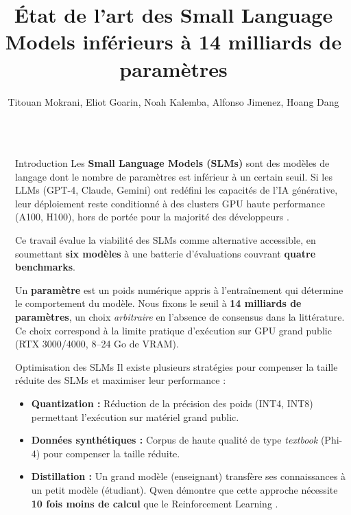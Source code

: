 \documentclass[final]{beamer}
\title{État de l'art des Small Language Models inférieurs à 14 milliards de paramètres}
\author{Titouan Mokrani, Eliot Goarin, Noah Kalemba, Alfonso Jimenez, Hoang Dang}
\institute[shortinst]{Université de Toulouse \\ \small Avec l'aide de Thomas Trouve de chez Neusta France}
\newlength{\sepwidth}
\newlength{\colwidth}
\newcommand{\separatorcolumn}{\begin{column}{\sepwidth}\end{column}}
\begin{document}
\begin{frame}[t]
\begin{columns}[t]
\separatorcolumn

\begin{column}{\colwidth}

  \begin{block}{Introduction}
    Les \textbf{Small Language Models (SLMs)} sont des modèles de langage dont le nombre de paramètres est inférieur à un certain seuil. Si les LLMs (GPT-4, Claude, Gemini) ont redéfini les capacités de l'IA générative, leur déploiement reste conditionné à des clusters GPU haute performance (A100, H100), hors de portée pour la majorité des développeurs \cite{corradini_state_2025}.

    Ce travail évalue la viabilité des SLMs comme alternative accessible, en soumettant \textbf{six modèles} à une batterie d'évaluations couvrant \textbf{quatre benchmarks}.

    Un \textbf{paramètre} est un poids numérique appris à l'entraînement qui détermine le comportement du modèle. Nous fixons le seuil à \textbf{14 milliards de paramètres}, un choix \textit{arbitraire} en l'absence de consensus dans la littérature. Ce choix correspond à la limite pratique d'exécution sur GPU grand public (RTX 3000/4000, 8–24 Go de VRAM).
  \end{block}


  \begin{block}{Optimisation des SLMs}
    Il existe plusieurs stratégies pour compenser la taille réduite des SLMs et maximiser leur performance :
    \begin{itemize}
      \item \textbf{Quantization :} Réduction de la précision des poids (INT4, INT8) permettant l'exécution sur matériel grand public.
      \item \textbf{Données synthétiques :} Corpus de haute qualité de type \textit{textbook} (Phi-4) pour compenser la taille réduite.
      \item \textbf{Distillation :} Un grand modèle (enseignant) transfère ses connaissances à un petit modèle (étudiant). Qwen démontre que cette approche nécessite \textbf{10 fois moins de calcul} que le Reinforcement Learning \cite{yang_qwen3_2025}.
    \end{itemize}
  \end{block}


\end{column}
\end{columns}
\end{frame}
\end{document}
